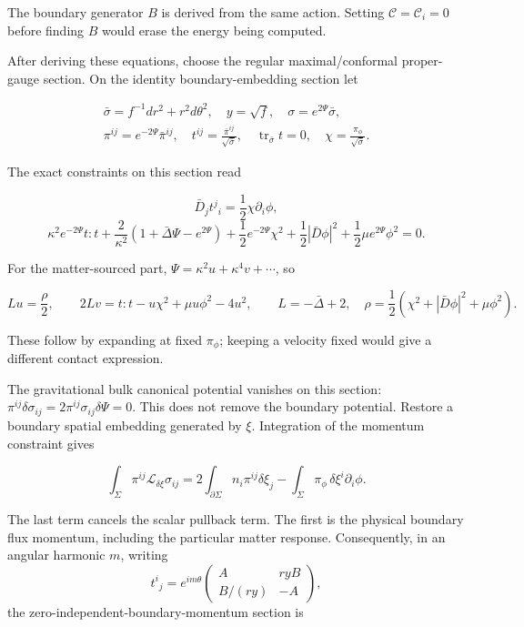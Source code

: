 The boundary generator \(B\) is derived from the same action. Setting \(\mathcal C=\mathcal C_i=0\) before finding \(B\) would erase the energy being computed.

After deriving these equations, choose the regular maximal/conformal proper-gauge section. On the identity boundary-embedding section let

\[
\begin{gathered}
\bar\sigma=f^{-1}dr^2+r^2d\theta^2,\quad y=\sqrt f,\quad
\sigma=e^{2\Psi}\bar\sigma,\\
\pi^{ij}=e^{-2\Psi}\bar\pi^{ij},\quad
t^{ij}=\frac{\bar\pi^{ij}}{\sqrt{\bar\sigma}},\quad
\operatorname{tr}_{\bar\sigma}t=0,\quad
\chi=\frac{\pi_\phi}{\sqrt{\bar\sigma}}.
\end{gathered}
\tag{2.13}
\]

The exact constraints on this section read

\[
\bar D_jt^j{}_i=\frac12\chi\partial_i\phi,
\tag{2.14}
\] \[
\kappa^2e^{-2\Psi}t:t
+\frac2{\kappa^2}(1+\bar\Delta\Psi-e^{2\Psi})
+\frac12e^{-2\Psi}\chi^2
+\frac12|\bar D\phi|^2
+\frac12\mu e^{2\Psi}\phi^2=0 .
\tag{2.15}
\]

For the matter-sourced part, \(\Psi=\kappa^2u+\kappa^4v+\cdots\), so

\[
Lu=\frac{\rho}{2},\qquad
2Lv=t:t-u\chi^2+\mu u\phi^2-4u^2,\qquad
L=-\bar\Delta+2,\quad
\rho=\frac12(\chi^2+|\bar D\phi|^2+\mu\phi^2).
\tag{2.16}
\]

These follow by expanding at fixed \(\pi_\phi\); keeping a velocity fixed would give a different contact expression.

The gravitational bulk canonical potential vanishes on this section: \(\pi^{ij}\delta\sigma_{ij}=2\pi^{ij}\sigma_{ij}\delta\Psi=0\). This does not remove the boundary potential. Restore a boundary spatial embedding generated by \(\xi\). Integration of the momentum constraint gives

\[
\int_\Sigma\pi^{ij}\mathcal L_{\delta\xi}\sigma_{ij}
=2\int_{\partial\Sigma}n_i\pi^{ij}\delta\xi_j
-\int_\Sigma\pi_\phi\,\delta\xi^i\partial_i\phi .
\tag{2.17}
\]

The last term cancels the scalar pullback term. The first is the physical boundary flux momentum, including the particular matter response. Consequently, in an angular harmonic \(m\), writing \[
t^i{}_j=e^{im\theta}
\begin{pmatrix}A&ryB\\ B/(ry)&-A\end{pmatrix},
\] the zero-independent-boundary-momentum section is

